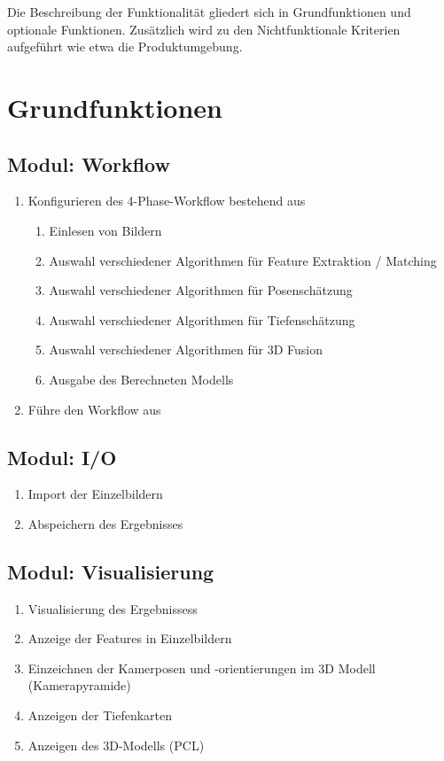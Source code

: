 
Die Beschreibung der Funktionalität gliedert sich in Grundfunktionen und optionale Funktionen. Zusätzlich wird zu den Nichtfunktionale Kriterien aufgeführt wie etwa die Produktumgebung.

\section{Grundfunktionen}
	\subsection{Modul: Workflow}
	\begin{enumerate}[ align=left, label={\textbf{\textbackslash 	FM1\arabic*0\textbackslash}} ]
		\item Konfigurieren des 4-Phase-Workflow bestehend aus
		\begin{enumerate}[  align=left, label={\textbf{\textbackslash FM11\arabic*\textbackslash}} ]
			\item Einlesen von Bildern
			\item Auswahl verschiedener Algorithmen für Feature Extraktion / Matching
			\item Auswahl verschiedener Algorithmen für Posenschätzung
			\item Auswahl verschiedener Algorithmen für Tiefenschätzung
			\item Auswahl verschiedener Algorithmen für 3D Fusion
			\item Ausgabe des Berechneten Modells
		\end{enumerate}
		\item Führe den Workflow aus
	\end{enumerate}

	\subsection{Modul: I/O}
		\begin{enumerate}[ align=left, label={\textbf{\textbackslash FM2\arabic*0\textbackslash}} ]
			\item Import der Einzelbildern
			\item Abspeichern des Ergebnisses
		\end{enumerate}

	\subsection{Modul: Visualisierung}
		\begin{enumerate}[ align=left, label={\textbf{\textbackslash FM3\arabic*0\textbackslash}} ]
			\item Visualisierung des Ergebnissess
			\item Anzeige der Features in Einzelbildern
			\item Einzeichnen der Kamerposen und -orientierungen im 3D Modell (Kamerapyramide)
			\item Anzeigen der Tiefenkarten
			\item Anzeigen des 3D-Modells (PCL)
		\end{enumerate}

